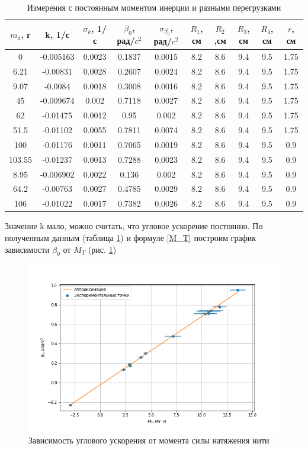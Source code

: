 \documentclass[a4paper,12pt]{article} %
\begin{document}
\begin{table}
\caption{Измерения с постоянным моментом инерции и разными перегрузками}
\label{Iconst}
\begin{tabular}{|c|c|c|c|c|c|c|c|c|c|}
\hline 
$m_\text{п}$, г & k, 1/с & $\sigma_k$, 1/с & $\beta_0$, рад/$c^2$ & $\sigma_{\beta_0}$, рад/$c^2$ & $R_1$, см & $R_2$,см & $R_3$, см & $R_4$, см & $r$, см \\
\hline 
0 & -0.005163 & 0.0023 & 0.1837 & 0.0015 & 8.2 & 8.6 & 9.4 & 9.5 & 1.75  \\ 
\hline
6.21 & -0.00831 & 0.0028 & 0.2607 & 0.0024 & 8.2 & 8.6 & 9.4 & 9.5 & 1.75 \\ 
\hline
9.07 & -0.0084 & 0.0018 & 0.3008 & 0.0016 & 8.2 & 8.6 & 9.4 & 9.5 & 1.75 \\ 
\hline
45 & -0.009674 & 0.002 & 0.7118 & 0.0027 & 8.2 & 8.6 & 9.4 & 9.5 & 1.75  \\ 
\hline
62 & -0.01475 & 0.0012 & 0.95 & 0.002 & 8.2 & 8.6 & 9.4 & 9.5 & 1.75  \\ 
\hline
51.5 & -0.01102 & 0.0055 & 0.7811 & 0.0074 & 8.2 & 8.6 & 9.4 & 9.5 & 1.75  \\ 
\hline
100 & -0.01176 & 0.0011 & 0.7065 & 0.0019 & 8.2 & 8.6 & 9.4 & 9.5 & 0.9  \\ 
\hline
103.55 & -0.01237 & 0.0013 & 0.7288 & 0.0023 & 8.2 & 8.6 & 9.4 & 9.5 & 0.9 \\ 
\hline
8.95 & -0.006902 & 0.0022 & 0.136 & 0.002 & 8.2 & 8.6 & 9.4 & 9.5 & 0.9  \\ 
\hline
64.2 & -0.00763 & 0.0027 & 0.4785 & 0.0029 & 8.2 & 8.6 & 9.4 & 9.5 & 0.9 \\ 
\hline
106 & -0.01022 & 0.0017 & 0.7382 & 0.0026 & 8.2 & 8.6 & 9.4 & 9.5 & 0.9 \\ 
\hline
\end{tabular} 
\end{table}
Значение k мало, можно считать, что угловое ускорение постоянно. По полученным данным (таблица \ref{Iconst}) и формуле \ref{M_T} построим график зависимости $\beta_0$ от $M_T$ (рис. \ref{betaM})


\begin{figure}[h!]
\begin{center}
\includegraphics[width=\textwidth]{beta(M)}
\end{center}
\caption{Зависимость углового ускорения от момента силы натяжения нити} \label{betaM}
\end{figure}
\end{document}
